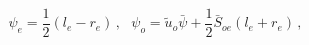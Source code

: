 \begin{equation}
\psi _{e}={\frac{1}{2}}(l_{e}-r_{e})\,,~~~\psi _{o}={\tilde{u}}_{o}\bar{\psi}%
+{\frac{1}{2}}\bar{S}_{oe}(l_{e}+r_{e})\,,  \label{eq:sinDD_lr2psi}
\end{equation}

